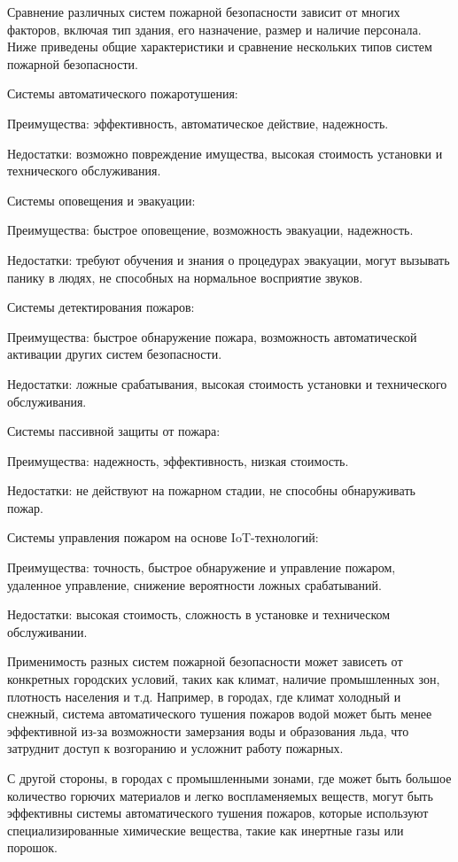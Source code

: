 \begin{multicols}{2}

Сравнение различных систем пожарной безопасности зависит от многих
факторов, включая тип здания, его назначение, размер и наличие
персонала. Ниже приведены общие характеристики и сравнение нескольких
типов систем пожарной безопасности.

Системы автоматического пожаротушения:

Преимущества: эффективность, автоматическое действие, надежность.

Недостатки: возможно повреждение имущества, высокая стоимость установки
и технического обслуживания.

Системы оповещения и эвакуации:

Преимущества: быстрое оповещение, возможность эвакуации, надежность.

Недостатки: требуют обучения и знания о процедурах эвакуации, могут
вызывать панику в людях, не способных на нормальное восприятие звуков.

Системы детектирования пожаров:

Преимущества: быстрое обнаружение пожара, возможность автоматической
активации других систем безопасности.

Недостатки: ложные срабатывания, высокая стоимость установки и
технического обслуживания.

Системы пассивной защиты от пожара:

Преимущества: надежность, эффективность, низкая стоимость.

Недостатки: не действуют на пожарном стадии, не способны обнаруживать
пожар.

Системы управления пожаром на основе IoT-технологий:

Преимущества: точность, быстрое обнаружение и управление пожаром,
удаленное управление, снижение вероятности ложных срабатываний.

Недостатки: высокая стоимость, сложность в установке и техническом
обслуживании.

Применимость разных систем пожарной безопасности может зависеть от
конкретных городских условий, таких как климат, наличие промышленных
зон, плотность населения и т.д. Например, в городах, где климат холодный
и снежный, система автоматического тушения пожаров водой может быть
менее эффективной из-за возможности замерзания воды и образования льда,
что затруднит доступ к возгоранию и усложнит работу пожарных.

С другой стороны, в городах с промышленными зонами, где может быть
большое количество горючих материалов и легко воспламеняемых веществ,
могут быть эффективны системы автоматического тушения пожаров, которые
используют специализированные химические вещества, такие как инертные
газы или порошок.


\end{multicols}
